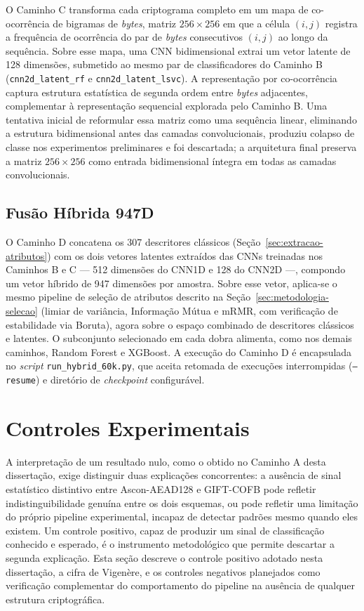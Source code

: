 O Caminho C transforma cada criptograma completo em um mapa de co-ocorrência de bigramas de \emph{bytes}, matriz $256 \times 256$ em que a célula $(i,j)$ registra a frequência de ocorrência do par de \emph{bytes} consecutivos $(i,j)$ ao longo da sequência. Sobre esse mapa, uma CNN bidimensional extrai um vetor latente de 128 dimensões, submetido ao mesmo par de classificadores do Caminho B (\texttt{cnn2d\_latent\_rf} e \texttt{cnn2d\_latent\_lsvc}). A representação por co-ocorrência captura estrutura estatística de segunda ordem entre \emph{bytes} adjacentes, complementar à representação sequencial explorada pelo Caminho B. Uma tentativa inicial de reformular essa matriz como uma sequência linear, eliminando a estrutura bidimensional antes das camadas convolucionais, produziu colapso de classe nos experimentos preliminares e foi descartada; a arquitetura final preserva a matriz $256 \times 256$ como entrada bidimensional íntegra em todas as camadas convolucionais.

\subsection{Fusão Híbrida 947D}
\label{sec:fusao-hibrida-caminho-d}

O Caminho D concatena os 307 descritores clássicos (Seção~\ref{sec:extracao-atributos}) com os dois vetores latentes extraídos das CNNs treinadas nos Caminhos B e C --- 512 dimensões do CNN1D e 128 do CNN2D ---, compondo um vetor híbrido de 947 dimensões por amostra. Sobre esse vetor, aplica-se o mesmo pipeline de seleção de atributos descrito na Seção~\ref{sec:metodologia-selecao} (limiar de variância, Informação Mútua e mRMR, com verificação de estabilidade via Boruta), agora sobre o espaço combinado de descritores clássicos e latentes. O subconjunto selecionado em cada dobra alimenta, como nos demais caminhos, Random Forest e XGBoost. A execução do Caminho D é encapsulada no \emph{script} \texttt{run\_hybrid\_60k.py}, que aceita retomada de execuções interrompidas (\texttt{--resume}) e diretório de \emph{checkpoint} configurável.


\section{Controles Experimentais}
A interpretação de um resultado nulo, como o obtido no Caminho A desta dissertação, exige distinguir duas explicações concorrentes: a ausência de sinal estatístico distintivo entre Ascon-AEAD128 e GIFT-COFB pode refletir indistinguibilidade genuína entre os dois esquemas, ou pode refletir uma limitação do próprio pipeline experimental, incapaz de detectar padrões mesmo quando eles existem. Um controle positivo, capaz de produzir um sinal de classificação conhecido e esperado, é o instrumento metodológico que permite descartar a segunda explicação. Esta seção descreve o controle positivo adotado nesta dissertação, a cifra de Vigenère, e os controles negativos planejados como verificação complementar do comportamento do pipeline na ausência de qualquer estrutura criptográfica.

